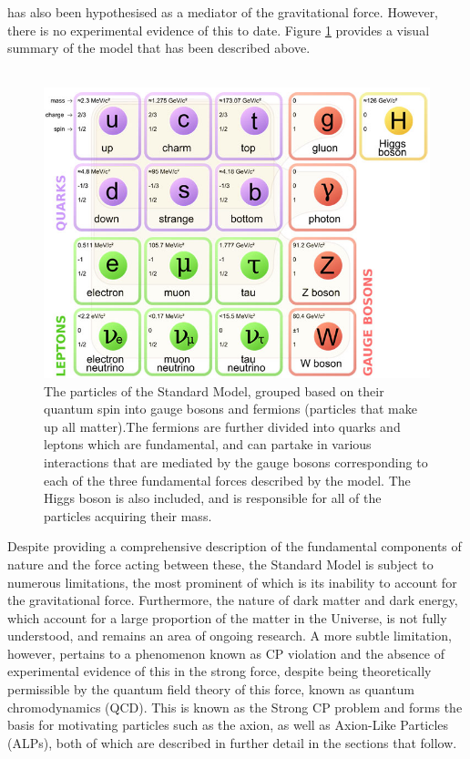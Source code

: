 has also been hypothesised as a mediator of the gravitational force. However, there is no experimental evidence of this to date. Figure \ref{StandardModel} provides a visual summary of the model that has been described above.\\
\\
\begin{figure}[h!]
    \centering
    \includegraphics[scale = 0.35]{StandardModel.jpg}
    \caption{The particles of the Standard Model, grouped based on their quantum spin into gauge bosons and fermions (particles that make up all matter).The fermions are further divided into quarks and leptons which are fundamental, and can partake in various interactions that are mediated by the gauge bosons corresponding to each of the three fundamental forces described by the model. The Higgs boson is also included, and is responsible for all of the particles acquiring their mass.}
    \label{StandardModel}
\end{figure}
Despite providing a comprehensive description of the fundamental components of nature and the force acting between these, the Standard Model is subject to numerous limitations, the most prominent of which is its inability to account for the gravitational force. Furthermore, the nature of dark matter and dark energy, which account for
a large proportion of the matter in the Universe, is not fully understood, and remains an area of ongoing research. A more subtle limitation, however, pertains to a phenomenon known as CP violation and the absence of experimental evidence of this in the strong force, despite being theoretically permissible by the quantum field theory of this force,
known as quantum chromodynamics (QCD). This is known as the Strong CP problem and forms the basis for motivating particles such as the axion, as well as Axion-Like Particles (ALPs), both of which are described in further detail in the sections that follow.
